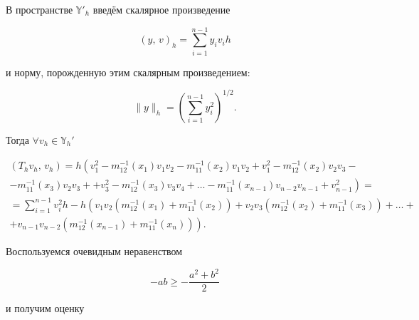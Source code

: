В пространстве $\mathbb{Y}'_h$ введём скалярное произведение

\[

(y,\,v)_h =\sum\limits_{i=1}^{n-1} y_iv_i h

\]

и норму, порожденную этим скалярным произведением:

\[

\| y\|_h =\left(\sum\limits_{i=1}^{n-1} y_i^2 \right)^{{1}/{2}}.

\]

Тогда $\forall v_h \in \mathbb{Y}_h'$

\begin{multline*}

(T_h v_h,\,v_h) = h\left(v_1^2 -m_{12}^{-1} (x_1) v_1 v_2 -m_{11}^{-1} (x_2)v_1

v_2 +v_1^2 -m_{12}^{-1} (x_2)v_2 v_3 - \right.\\

-m_{11}^{-1} (x_3)v_2 v_3 +  \left.+v_3^2

-m_{12}^{-1} (x_3)v_3 v_4 +\ldots- m_{11}^{-1} (x_{n-1})v_{n-2} v_{n-1} +v_{n-1}^2 \right)=\\

=\sum\limits_{i=1}^{n-1}

v_i^2 h-h \left(v_1 v_2 \left(m_{12}^{-1} (x_1)+m_{11}^{-1} (x_2) \right)+v_2 v_3

\left(m_{12}^{-1} (x_2)+ m_{11}^{-1} (x_3) \right)+\ldots+ \right. \\

\left. + v_{n-1} v_{n-2} \left(m_{12}^{-1} (x_{n-1})+m_{11}^{-1} (x_n) \right) \right).

\end{multline*}



Воспользуемся очевидным неравенством

\[

-ab \ge -\frac{a^2+b^2}{2}

\]

и получим оценку

